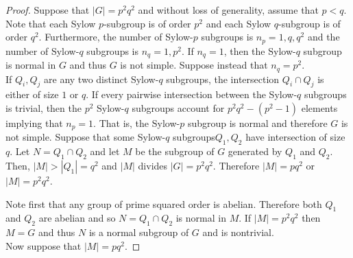 \documentclass[../AlgebraQualSolutions.tex]{subfiles}
\begin{document}
\begin{proof}
Suppose that $|G| = p^2q^2$ and without loss of generality, assume that $p < q$. Note that each Sylow $p$-subgroup is of order $p^2$ and each Sylow $q$-subgroup is of order $q^2$. Furthermore, the number of Sylow-$p$ subgroups is $n_p = 1, q, q^2$ and the number of Sylow-$q$ subgroups is $n_q = 1, p^2$. If $n_q = 1$, then the Sylow-$q$ subgroup is normal in $G$ and thus $G$ is not simple. Suppose instead that $n_q = p^2$.\\

If $Q_i, Q_j$ are any two distinct Sylow-$q$ subgroups, the intersection $Q_i \cap Q_j$ is either of size $1$ or $q$. If every pairwise intersection between the Sylow-$q$ subgroups is trivial, then the $p^2$ Sylow-$q$ subgroups account for $p^2q^2 - (p^2 -1)$ elements implying that $n_p = 1$. That is, the Sylow-$p$ subgroup is normal and therefore $G$ is not simple. Suppose that some Sylow-$q$ subgroups$Q_1, Q_2$ have intersection of size $q$. Let $N = Q_1 \cap Q_2$ and let $M$ be the subgroup of $G$ generated by $Q_1$ and $Q_2$. Then, $|M| > |Q_1| = q^2$ and $|M|$ divides $|G| = p^2q^2$. Therefore $|M| = pq^2$ or $|M| = p^2 q^2$. 

Note first that any group of prime squared order is abelian. Therefore both $Q_1$ and $Q_2$ are abelian and so $N = Q_1 \cap Q_2$ is normal in $M$. If $|M| = p^2q^2$ then $M=G$ and thus $N$ is a normal subgroup of $G$ and is nontrivial.\\

Now suppose that $|M| = pq^2$. 
\end{proof}
\end{document}

